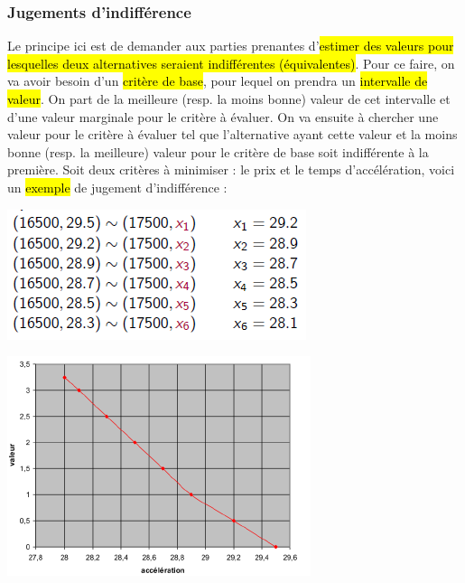 \documentclass[a4paper, 12pt]{article}
\newcommand{\alinea}{
\hspace*{0.5cm}}
\begin{document}
		\subsubsection{Jugements d'indifférence}
			\alinea Le principe ici est de demander aux parties prenantes d'\hl{estimer des valeurs pour lesquelles deux alternatives
				seraient indifférentes (équivalentes)}. Pour ce faire, on va avoir besoin d'un \hl{critère de base}, pour lequel
				on prendra un \hl{intervalle de valeur}. On part de la meilleure (resp. la moins bonne) valeur de cet intervalle et 
				d'une valeur marginale pour le critère à évaluer. On va ensuite à chercher une valeur pour le critère à évaluer tel 
				que l'alternative ayant	cette valeur et la moins bonne (resp. la meilleure) valeur pour le critère de base soit 
				indifférente à la première. Soit deux critères à minimiser : le prix et le temps d'accélération, voici un \hl{exemple} 
				de jugement d'indifférence :\\
				\begin{minipage}{0.49\textwidth}
					\includegraphics[width=\textwidth]{Images/indifference} 
				\end{minipage}\hfill
				\begin{minipage}{0.5\textwidth}
					\includegraphics[width=\textwidth]{Images/indifference2}
				\end{minipage}~\\~\\~\\
\end{document}
